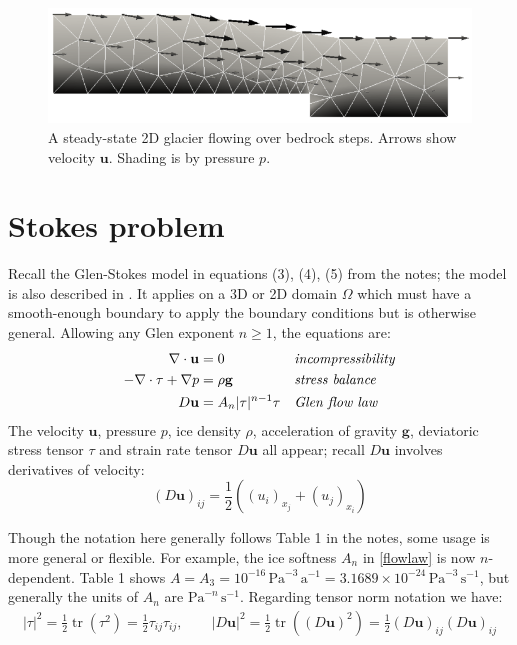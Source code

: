 \documentclass[letterpaper,final,12pt,reqno]{amsart}
\newcommand{\trace}{\operatorname{tr}}
\newcommand{\bg}{\mathbf{g}}
\newcommand{\bu}{\mathbf{u}}
\begin{document}
\begin{figure}[h]
\includegraphics[width=\textwidth,angle=-5.7296]{stepflowlin}  %
\caption{A steady-state 2D glacier flowing over bedrock steps.  Arrows show velocity $\bu$.  Shading is by pressure $p$.}
\label{fig:stepflowlin}
\end{figure}


\section{Stokes problem}

Recall the Glen-Stokes model in equations (3), (4), (5) from the notes; the model is also described in \cite{GreveBlatter2009,JouvetRappaz2011}.  It applies on a 3D or 2D domain $\Omega$ which must have a smooth-enough boundary to apply the boundary conditions but is otherwise general.  Allowing any Glen exponent $n\ge 1$, the equations are:
\begin{align}
\nabla \cdot \bu &= 0 &&\text{\emph{incompressibility}} \label{incompressible} \\
- \nabla \cdot \tau + \nabla p &= \rho \bg &&\text{\emph{stress balance}} \label{forcebalance} \\
D\bu &= A_n |\tau|^{n-1} \tau &&\text{\emph{Glen flow law}} \label{flowlaw}
\end{align}
The velocity $\bu$, pressure $p$, ice density $\rho$, acceleration of gravity $\bg$, deviatoric stress tensor $\tau$ and strain rate tensor $D\bu$ all appear; recall $D\bu$ involves derivatives of velocity:
\begin{equation}
(D\bu)_{ij} = \frac{1}{2} \left((u_i)_{x_j} + (u_j)_{x_i}\right) \label{strainrate}
\end{equation}

Though the notation here generally follows Table 1 in the notes, some usage is more general or flexible.  For example, the ice softness $A_n$ in \eqref{flowlaw} is now $n$-dependent.  Table 1 shows $A = A_3 = 10^{-16} \,\text{Pa}^{-3}\,\text{a}^{-1} = 3.1689 \times 10^{-24} \,\text{Pa}^{-3}\,\text{s}^{-1}$, but generally the units of $A_n$ are $\text{Pa}^{-n}\,\text{s}^{-1}$.  Regarding tensor norm notation we have:
\begin{align*}
|\tau|^2 = \frac{1}{2} \trace\left(\tau^2\right) = \frac{1}{2} \tau_{ij} \tau_{ij}, \qquad |D\bu|^2 = \frac{1}{2} \trace\left((D\bu)^2\right) = \frac{1}{2} (D\bu)_{ij} (D\bu)_{ij}
\end{align*}
\end{document}
